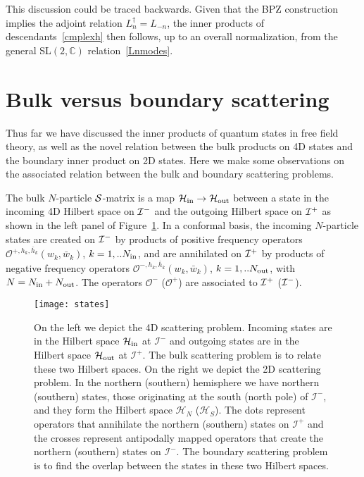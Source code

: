 \documentclass[11pt]{article}
\def\co{\mathcal{O}}
\def\ch{\cal{H}}
\def\ci{\cal{I}}
\numberwithin{equation}{section}
\begin{document}
This discussion could be traced backwards. Given that the BPZ construction implies the adjoint relation $L_n^\dagger = L_{-n}$, 
the inner products of descendants~\eqref{cmplexh} then follows, up to an overall normalization,  from the  
general SL$(2,\mathbb{C})$ relation~\eqref{Lnmodes}.

\section{Bulk versus boundary scattering}\label{sec:bulkvboundary}

Thus far we have discussed the inner products of quantum states in free field theory, as well as the novel relation between the bulk products on 4D states and the boundary inner product on 2D states. Here we make some observations on the associated relation between the bulk and boundary scattering problems. 

The bulk $N$-particle $\cal S$-matrix is a map $\ch_{\rm in}\to \ch_{\rm out}$ between a state in the incoming 4D Hilbert space on $\cal{I}^-$ and the outgoing Hilbert space on $\ci^+$ as shown in the left panel of Figure~\ref{hilbertpic}. In a conformal basis, the incoming $N$-particle states are created on $\cal{I}^-$ by products of positive frequency operators ${\mathcal{O}}^{ +, h_k,\bar{h}_k}(w_k, \bar w_k)$, $k=1,..N_{\rm in}$,  and are annihilated on $\ci^+$ by 
products of negative  frequency operators ${\mathcal{O}}^{ -, h_k,\bar{h}_k}(w_k, \bar w_k)$, $k=1,..N_{\rm out }$, with $N= N_{\rm in}+N_{\rm out}$.  The operators $\co^-$ ($\co^+$) are associated to $\ci^+$ ($\ci^-$). 

\begin{figure}[thb]
\begin{center}
\texttt{[image: states]}
\end{center}
\caption{On the left we depict the 4D scattering problem. Incoming states are in the Hilbert space $\mathcal{H}_{\rm{in}}$ at $\mathcal{I}^-$ and outgoing states are in the Hilbert space $\mathcal{H}_{\rm{out}}$ at $\mathcal{I}^+$. The bulk scattering problem is to relate these two Hilbert spaces. On the right we depict the 2D scattering problem. In the northern (southern) hemisphere we have northern (southern) states, those originating at the south (north pole) of $\mathcal{I}^-$, and they form the Hilbert space $\mathcal{H}_N$ ($\mathcal{H}_S$). The dots represent operators that annihilate the northern (southern) states on $\mathcal{I}^+$ and the crosses represent antipodally mapped operators that create the northern (southern) states on $\mathcal{I}^-$. The boundary scattering problem is to find the overlap between the states in these two Hilbert spaces.}
\label{hilbertpic}
\end{figure}
\end{document}
